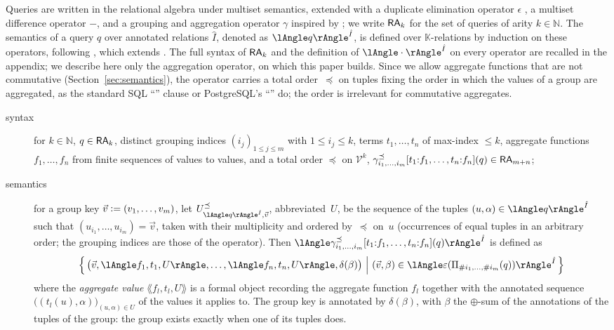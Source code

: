 Queries are written in the relational algebra under multiset semantics,
extended with a duplicate elimination operator $\epsilon$
\cite{DBLP:conf/pods/DayalGK82,DBLP:journals/iandc/GrumbachM99}, a
multiset difference operator $-$, and a grouping and aggregation
operator $\gamma$ inspired by \cite{DBLP:journals/tcs/Libkin03}; we write
$\mathsf{RA}_k$ for the set of queries of arity $k\in\mathbb N$.
The semantics of a query $q$ over annotated relations $\hat I$, denoted as
$\angsem{\hat I}{q}$, is defined over $\mathbb K$-relations by induction
on these operators, following \cite{sen2026provsql}, which extends
\cite{green2007provenance,geerts2010database,amsterdamer2011provenance}.
The full syntax of $\mathsf{RA}_k$ and the definition of $\angsem{\hat
I}{\cdot}$ on every operator are recalled in the appendix; we describe
here only the
aggregation operator, on which this paper builds. Since we allow
aggregate functions that are not commutative (Section~\ref{sec:semantics}),
the operator carries a total order~$\preceq$ on tuples fixing the order
in which the values of a group are aggregated, as the standard SQL
``'' clause or PostgreSQL's
``'' do; the order is irrelevant for
commutative aggregates.
\smallskip
\begin{description}
  \item[syntax] for $k\in\mathbb N$, $q\in\mathsf{RA}_k$, distinct grouping
    indices $(i_j)_{1\leq j\leq m}$ with $1\leq i_j\leq k$, terms
    $t_1,\dots,t_n$ of max-index $\leq k$, aggregate functions
    $f_1,\dots,f_n$ from finite sequences of values to values, and a
    total order $\preceq$ on $\mathcal V^k$,
    $\gamma^{\preceq}_{i_1,\dots,i_m}[t_1{:}f_1,\dots,t_n{:}f_n](q)\in\mathsf{RA}_{m+n}$;
  \item[semantics] for a group key $\vec v\mathrel{\mathop:}= (v_1,\dots,v_m)$, let
    $U^{\preceq}_{\angsem{\hat I}{q},\vec v}$, abbreviated~$U$, be the
    sequence of the tuples $(u,\alpha)\in\angsem{\hat I}{q}$ such that
    $(u_{i_1},\dots,u_{i_m})=\vec v$, taken with their multiplicity and
    ordered by~$\preceq$ on~$u$ (occurrences of equal tuples in an
    arbitrary order; the grouping indices are those of the operator). Then
    $\angsem{\hat I}{\gamma^{\preceq}_{i_1,\dots,i_m}[t_1{:}f_1,\dots,t_n{:}f_n](q)}$
    is defined as
    \[
      \Bigl\{\,\bigl(\vec v,\lAngle f_1,t_1,U\rAngle,\dots,
      \lAngle f_n,t_n,U\rAngle,\delta(\beta)\bigr)\ \Big|\
      (\vec v,\beta)\in\angsem{\hat
      I}{\epsilon(\Pi_{\#i_1,\dots,\#i_m}(q))}\,\Bigr\}
    \]
    where the \emph{aggregate value} $\lAngle f_l,t_l,U\rAngle$ is a
    formal object recording the aggregate function $f_l$ together with
    the annotated sequence $\bigl((t_l(u),\alpha)\bigr)_{(u,\alpha)\in U}$
    of the values it applies to. The group key is annotated by
    $\delta(\beta)$, with $\beta$ the $\oplus$-sum of the annotations of
    the tuples of the group: the group exists exactly when one of its
    tuples does.
\end{description}

